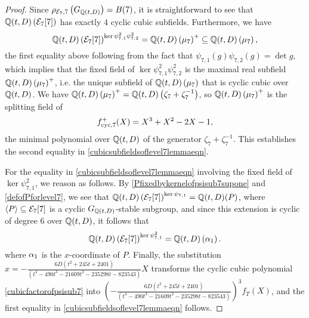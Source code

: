\begin{proof}
Since $\rho_{\mathcal{E}_7,7}\left(G_{\mathbb{Q}(t,D)}\right) = B(7)$, it is straightforward to see that $\mathbb{Q}(t,D)\left( \mathcal{E}_7[7] \right)$ has exactly $4$ cyclic cubic subfields.  Furthermore, we have
\[
\mathbb{Q}(t,D)\left(\mathcal{E}_7[7] \right)^{\ker \psi_{7,1}^2 \psi_{7,2}^2} = \mathbb{Q}(t,D)\left( \mu_7 \right)^+ \subseteq \mathbb{Q}(t,D)\left( \mu_7 \right),
\]
the first equality above following from the fact that $\psi_{7,1}(g)\psi_{7,2}(g) = \det g$, which implies that the fixed field of $\ker \psi_{7,1}^2 \psi_{7,2}^2$ is the maximal real subfield $\mathbb{Q}(t,D)\left( \mu_7 \right)^+$, i.e. the unique subfield of $\mathbb{Q}(t,D)\left( \mu_7 \right)$ that is cyclic cubic over $\mathbb{Q}(t,D)$.  We have $\mathbb{Q}(t,D)\left( \mu_7 \right)^+ = \mathbb{Q}(t,D)\left( \zeta_7 + \zeta_7^{-1} \right)$, so $\mathbb{Q}(t,D)\left( \mu_7 \right)^+$ is the splitting field of
\[
f_{\operatorname{cyc},7}^+(X) = X^3 + X^2 - 2X - 1,
\]
the minimal polynomial over $\mathbb{Q}(t,D)$ of the generator $\zeta_7 + \zeta_7^{-1}$.  This establishes the second equality in \eqref{cubicsubfieldsoflevel7lemmaeqn}.

For the equality in \eqref{cubicsubfieldsoflevel7lemmaeqn} involving the fixed field of $\ker \psi_{7,1}^2$, we reason as follows.  By \eqref{Pfixedbykernelofpsisub7supone} and \eqref{defofPforlevel7}, we see that $\mathbb{Q}(t,D)\left( \mathcal{E}_7[7] \right)^{\ker \psi_{7,1}} = \mathbb{Q}(t,D)(P)$, where $\langle P \rangle \subseteq \mathcal{E}_7[7]$ is a cyclic $G_{\mathbb{Q}(t,D)}$-stable subgroup, and since this extension is cyclic of degree $6$ over $\mathbb{Q}(t,D)$, it follows that
\begin{equation} \label{generatedbyxcoordinateofP}
\mathbb{Q}(t,D)\left( \mathcal{E}_7[7] \right)^{\ker \psi_{7,1}^2} = \mathbb{Q}(t,D)\left( \alpha_1 \right).
\end{equation}
where $\alpha_1$ is the $x$-coordinate of $P$.
Finally, the substitution $x = -\frac{6D(t^2 + 245t + 2401)}{(t^4 - 490t^3 - 21609t^2 - 235298t - 823543)}X$ transforms the cyclic cubic polynomial \eqref{cubicfactorofpsisub7} into $\left( -\frac{6D(t^2 + 245t + 2401)}{(t^4 - 490t^3 - 21609t^2 - 235298t - 823543)} \right)^3f_T(X)$, and the first equality in \eqref{cubicsubfieldsoflevel7lemmaeqn} follows.


\end{proof}
